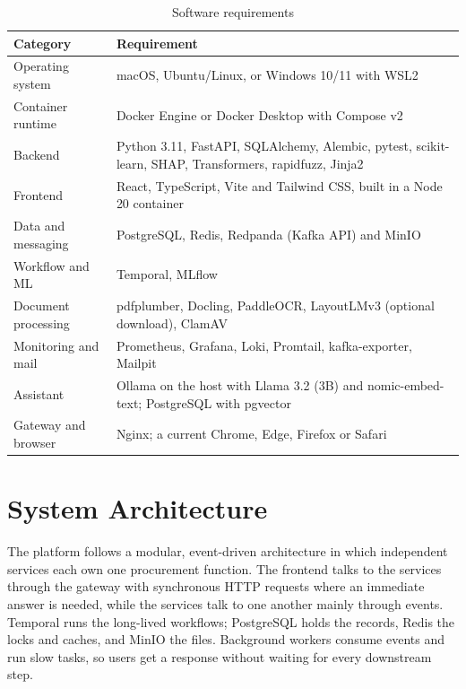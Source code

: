 \begin{table}[!htbp]
\centering\tablestyle
\caption{Software requirements}\label{tab:sw}
\begin{tabularx}{\textwidth}{|L{0.20\textwidth}|Y|}
\hline
\textbf{Category} & \textbf{Requirement} \\ \hline
Operating system & macOS, Ubuntu/Linux, or Windows 10/11 with WSL2 \\ \hline
Container runtime & Docker Engine or Docker Desktop with Compose v2 \\ \hline
Backend & Python 3.11, FastAPI, SQLAlchemy, Alembic, pytest, scikit-learn, SHAP, Transformers, rapidfuzz, Jinja2 \\ \hline
Frontend & React, TypeScript, Vite and Tailwind CSS, built in a Node 20 container \\ \hline
Data and messaging & PostgreSQL, Redis, Redpanda (Kafka API) and MinIO \\ \hline
Workflow and ML & Temporal, MLflow \\ \hline
Document processing & pdfplumber, Docling, PaddleOCR, LayoutLMv3 (optional download), ClamAV \\ \hline
Monitoring and mail & Prometheus, Grafana, Loki, Promtail, kafka-exporter, Mailpit \\ \hline
Assistant & Ollama on the host with Llama 3.2 (3B) and nomic-embed-text; PostgreSQL with pgvector \\ \hline
Gateway and browser & Nginx; a current Chrome, Edge, Firefox or Safari \\ \hline
\end{tabularx}
\end{table}

\section{System Architecture}
The platform follows a modular, event-driven architecture in which independent services each own one procurement function. The frontend talks to the services through the gateway with synchronous HTTP requests where an immediate answer is needed, while the services talk to one another mainly through events. Temporal runs the long-lived workflows; PostgreSQL holds the records, Redis the locks and caches, and MinIO the files. Background workers consume events and run slow tasks, so users get a response without waiting for every downstream step.


